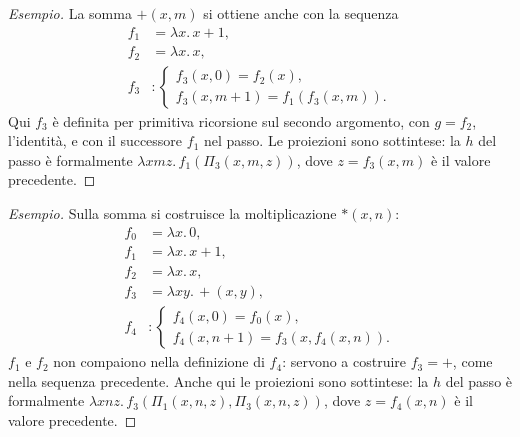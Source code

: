 \documentclass[a4paper, 11pt, oneside]{book}
\theoremstyle{formale}
\newenvironment{esempio}
    {\begin{proof}[\textit{Esempio}]\renewcommand{\qedsymbol}{$\diamond$}}
    {\end{proof}}
\begin{document}
    \begin{esempio}
        La somma ${+}(x, m)$ si ottiene anche con la sequenza
        \begin{equation*}
            \begin{aligned}
                f_1 &= \lambda x.\, x + 1, \\
                f_2 &= \lambda x.\, x, \\
                f_3 &\colon
                \begin{cases}
                    f_3(x, 0) = f_2(x), \\
                    f_3(x, m + 1) = f_1(f_3(x, m)).
                \end{cases}
            \end{aligned}
        \end{equation*}
        Qui $f_3$ \`e definita per primitiva ricorsione sul secondo argomento, con
        $g = f_2$, l'identit\`a, e con il successore $f_1$ nel passo. Le proiezioni sono
        sottintese: la $h$ del passo \`e formalmente
        $\lambda x m z.\, f_1(\Pi_3(x, m, z))$, dove $z = f_3(x, m)$ \`e il valore
        precedente.
    \end{esempio}

    \begin{esempio}
        Sulla somma si costruisce la moltiplicazione ${*}(x, n)$:
        \begin{equation*}
            \begin{aligned}
                f_0 &= \lambda x.\, 0, \\
                f_1 &= \lambda x.\, x + 1, \\
                f_2 &= \lambda x.\, x, \\
                f_3 &= \lambda x y.\, {+}(x, y), \\
                f_4 &\colon
                \begin{cases}
                    f_4(x, 0) = f_0(x), \\
                    f_4(x, n + 1) = f_3(x, f_4(x, n)).
                \end{cases}
            \end{aligned}
        \end{equation*}
        $f_1$ e $f_2$ non compaiono nella definizione di $f_4$: servono a costruire
        $f_3 = {+}$, come nella sequenza precedente. Anche qui le proiezioni sono
        sottintese: la $h$ del passo \`e formalmente
        $\lambda x n z.\, f_3(\Pi_1(x, n, z), \Pi_3(x, n, z))$, dove $z = f_4(x, n)$ \`e
        il valore precedente.
    \end{esempio}
\end{document}
